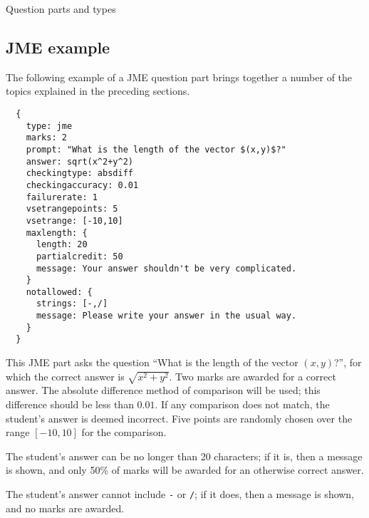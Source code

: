 \begin{chapter}{\label{cha:question_parts}Question parts and types}
  \subsection{JME example}
  The following example of a JME question part brings together a number of the
  topics explained in the preceding sections.
  \begin{Verbatim}
  {
    type: jme
    marks: 2
    prompt: "What is the length of the vector $(x,y)$?"
    answer: sqrt(x^2+y^2)
    checkingtype: absdiff
    checkingaccuracy: 0.01
    failurerate: 1
    vsetrangepoints: 5
    vsetrange: [-10,10]
    maxlength: {
      length: 20
      partialcredit: 50
      message: Your answer shouldn't be very complicated.
    }
    notallowed: {
      strings: [-,/]
      message: Please write your answer in the usual way.
    }
  }
  \end{Verbatim}
  This JME part asks the question ``What is the length of the vector
  $(x,y)$?'', for which the correct answer is $\sqrt{x^{2}+y^{2}}$.  Two marks
  are awarded for a correct answer.  The absolute difference method of
  comparison will be used; this difference should be less than $0.01$.  If any
  comparison does not match, the student's answer is deemed incorrect.  Five
  points are randomly chosen over the range $[-10,10]$ for the comparison.

  The student's answer can be no longer than 20 characters; if it is, then a
  message is shown, and only 50\% of marks will be awarded for an otherwise
  correct answer.

  The student's answer cannot include \verb"-" or \verb"/"; if it does, then a
  message is shown, and no marks are awarded.


\end{chapter}
